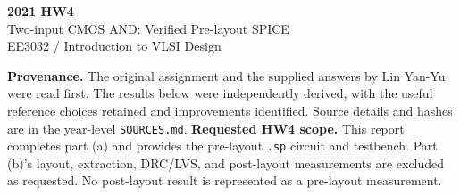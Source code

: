 \documentclass[11pt,a4paper]{article}
\begin{document}
\begin{center}{\LARGE\bfseries 2021 HW4}\\[4pt]{\large Two-input CMOS AND: Verified Pre-layout SPICE}\\[4pt]{\small EE3032 / Introduction to VLSI Design}\end{center}
\textbf{Provenance.} The original assignment and the supplied answers by Lin Yan-Yu were read first. The results below were independently derived, with the useful reference choices retained and improvements identified. Source details and hashes are in the year-level \texttt{SOURCES.md}.
\textbf{Requested HW4 scope.} This report completes part (a) and provides the pre-layout \texttt{.sp} circuit and testbench. Part (b)'s layout, extraction, DRC/LVS, and post-layout measurements are excluded as requested. No post-layout result is represented as a pre-layout measurement.
\end{document}
